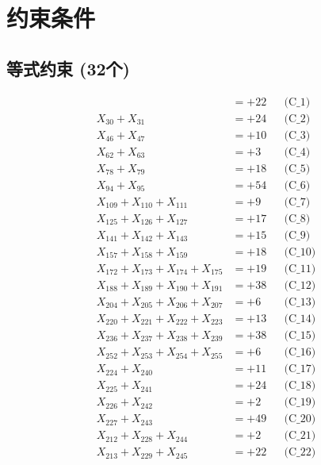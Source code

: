 \documentclass[a4paper,10pt]{article}
\begin{document}
\section{约束条件}

\subsection{等式约束 (32个)}

\allowdisplaybreaks
{\small
\begin{align}
 &= +22 && \text{(C\_1)} \\
X_{30} + X_{31} &= +24 && \text{(C\_2)} \\
X_{46} + X_{47} &= +10 && \text{(C\_3)} \\
X_{62} + X_{63} &= +3 && \text{(C\_4)} \\
X_{78} + X_{79} &= +18 && \text{(C\_5)} \\
\allowbreak
X_{94} + X_{95} &= +54 && \text{(C\_6)} \\
X_{109} + X_{110} + X_{111} &= +9 && \text{(C\_7)} \\
X_{125} + X_{126} + X_{127} &= +17 && \text{(C\_8)} \\
X_{141} + X_{142} + X_{143} &= +15 && \text{(C\_9)} \\
X_{157} + X_{158} + X_{159} &= +18 && \text{(C\_10)} \\
\allowbreak
X_{172} + X_{173} + X_{174} + X_{175} &= +19 && \text{(C\_11)} \\
X_{188} + X_{189} + X_{190} + X_{191} &= +38 && \text{(C\_12)} \\
X_{204} + X_{205} + X_{206} + X_{207} &= +6 && \text{(C\_13)} \\
X_{220} + X_{221} + X_{222} + X_{223} &= +13 && \text{(C\_14)} \\
X_{236} + X_{237} + X_{238} + X_{239} &= +38 && \text{(C\_15)} \\
\allowbreak
X_{252} + X_{253} + X_{254} + X_{255} &= +6 && \text{(C\_16)} \\
X_{224} + X_{240} &= +11 && \text{(C\_17)} \\
X_{225} + X_{241} &= +24 && \text{(C\_18)} \\
X_{226} + X_{242} &= +2 && \text{(C\_19)} \\
X_{227} + X_{243} &= +49 && \text{(C\_20)} \\
\allowbreak
X_{212} + X_{228} + X_{244} &= +2 && \text{(C\_21)} \\
X_{213} + X_{229} + X_{245} &= +22 && \text{(C\_22)} \\

\end{align}}
\end{document}
